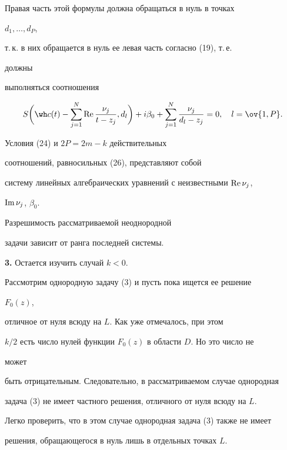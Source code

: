 Правая часть этой формулы должна обращаться в нуль в точках 


$d_1,\dotsc,d_P$, 


т.\,к. в них обращается в нуль ее левая часть согласно (19), т.\,е. 


должны 


выполняться соотношения 


\begin{equation} 


S\bigg(\wh c(t)-\sum^N_{j=1}\re\frac{\nu_j}{t-z_j}, 


d_l\bigg)+i\beta_0+\sum^N_{j=1} 


\frac{\nu_j}{d_l-z_j}=0,\quad l=\ov{1,P}. 


\end{equation} 


 


Условия (24) и $2P=2m-k$ действительных 


соотношений, равносильных (26), представляют собой 


систему линейных алгебраических уравнений с неизвестными $\operatorname{Re}\nu_j$, 


$\operatorname{Im}\nu_j$, $\beta_0$. 


 


Разрешимость рассматриваемой неоднородной 


задачи зависит от ранга последней системы. 


\medskip 


 


{\bf 3.} Остается изучить случай $k<0$. 


Рассмотрим однородную задачу (3) и пусть пока ищется ее решение 


$F_0(z)$, 


отличное от нуля всюду на $L$. Как уже отмечалось, при этом 


$k/2$ есть число нулей функции $F_0(z)$ в области $D$. Но это число не 


может 


быть отрицательным. Следовательно, в рассматриваемом случае однородная 


задача (3) не имеет частного решения, отличного от нуля всюду на $L$. 


Легко проверить, что в этом случае однородная задача (3) также не имеет 


решения, обращающегося в нуль лишь в отдельных точках $L$. 


